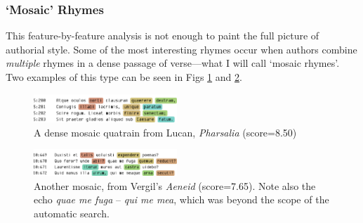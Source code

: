 \documentclass[twocolumn, switch, a4paper]{article} %
\begin{document}
\subsubsection{`Mosaic' Rhymes}
\label{sec:mosaic}

This feature-by-feature analysis is not enough to paint the full picture of
authorial style. Some of the most interesting rhymes occur when authors
combine \emph{multiple} rhymes in a dense passage of verse---what I will call
`mosaic rhymes'. Two examples of this type can be seen in Figs
\ref{fig:mosaic_phars} and \ref{fig:mosaic_aen}.

\begin{figure}[h]
    \caption{A dense mosaic quatrain from Lucan, \emph{Pharsalia} (score=8.50)}
    \label{fig:mosaic_phars}
    \centering
    \includegraphics[width=0.48\textwidth]{phar_mosaic.pdf}
\end{figure}

\begin{figure}[h]
    \caption{Another mosaic, from Vergil's \emph{Aeneid} (score=7.65). Note also the echo \emph{quae me fuga} -- \emph{qui me mea}, which was beyond the scope of the automatic search.}
    \label{fig:mosaic_aen}
    \centering
    \includegraphics[width=0.48\textwidth]{aen_mosaic.pdf}
\end{figure}
\end{document}

